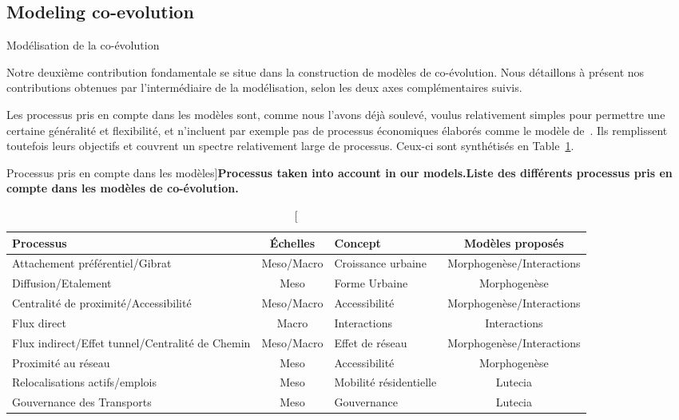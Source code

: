 


\subsection{Modeling co-evolution}{Modélisation de la co-évolution}


Notre deuxième contribution fondamentale se situe dans la construction de modèles de co-évolution. Nous détaillons à présent nos contributions obtenues par l'intermédiaire de la modélisation, selon les deux axes complémentaires suivis.


Les processus pris en compte dans les modèles sont, comme nous l'avons déjà soulevé, voulus relativement simples pour permettre une certaine généralité et flexibilité, et n'incluent par exemple pas de processus économiques élaborés comme le modèle de~\cite{levinson2007co}. Ils remplissent toutefois leurs objectifs et couvrent un spectre relativement large de processus. Ceux-ci sont synthétisés en Table~\ref{tab:contributions:modeled}. 


\begin{table}
\caption[Processus taken into account in our models][Processus pris en compte dans les modèles]{\textbf{Processus taken into account in our models.}\label{tab:contributions:modeled}}{\textbf{Liste des différents processus pris en compte dans les modèles de co-évolution.}\label{tab:contributions:modeled}}
\begin{tabular}[6pt]{|p{4cm}|c|p{4cm}|c|}
\hline
Processus & Échelles & Concept & Modèles proposés\\\hline
Attachement préférentiel/Gibrat  & Meso/Macro & Croissance urbaine & Morphogenèse/Interactions \\\hline
Diffusion/Etalement & Meso & Forme Urbaine & Morphogenèse \\\hline
Centralité de proximité/Accessibilité & Meso/Macro & Accessibilité & Morphogenèse/Interactions \\\hline
Flux direct & Macro & Interactions & Interactions\\\hline
Flux indirect/Effet tunnel/Centralité de Chemin & Meso/Macro & Effet de réseau & Morphogenèse/Interactions \\\hline
Proximité au réseau & Meso & Accessibilité & Morphogenèse \\\hline
Relocalisations actifs/emplois & Meso & Mobilité résidentielle & Lutecia\\\hline
Gouvernance des Transports & Meso & Gouvernance & Lutecia\\\hline
\end{tabular}
\end{table}



